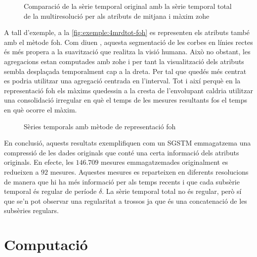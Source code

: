 \begin{figure}[tp]
  \centering
  
  \caption{Comparació de la sèrie temporal original amb la sèrie temporal total de la multiresolució per als atributs de mitjana i màxim \gls{zohe}}
  \label{fig:exemple:4mrdtot}
\end{figure}







A tall d'exemple, a la
\autoref{fig:exemple:4mrdtot-foh} es representen els atributs també
amb el mètode \gls{foh}. Com diuen \textcite{keogh97}, aquesta
segmentació de les corbes en línies rectes és més propera a la
suavització que realitza la visió humana.  Això no obstant, les
agregacions estan computades amb \gls{zohe} i per tant la
visualització dels atributs sembla desplaçada temporalment cap a la
dreta. Per tal que quedés més centrat es podria utilitzar una
agregació centrada en l'interval. Tot i així perquè en la
representació \gls{foh} els màxims quedessin a la cresta de
l'envolupant caldria utilitzar una consolidació irregular en què el
temps de les mesures resultants fos el temps en què ocorre el màxim.


\begin{figure}[tp]
  \centering
  
  \caption{Sèries temporals amb mètode de representació \gls{foh}}
  \label{fig:exemple:4mrdtot-foh}
\end{figure}



En conclusió, aquests resultats exemplifiquen com un \gls{SGSTM}
emmagatzema una compressió de les dades originals que conté una certa
informació dels atributs originals. En efecte, les $146.709$ mesures
emmagatzemades originalment es redueixen a $92$ mesures. Aquestes
mesures es reparteixen en diferents resolucions de manera que hi ha
més informació per als temps recents i que cada subsèrie temporal és
regular de període $\delta$. La sèrie temporal total no és regular,
però sí que se'n pot observar una regularitat a trossos ja que és una
concatenació de les subsèries regulars.




\section{Computació}



